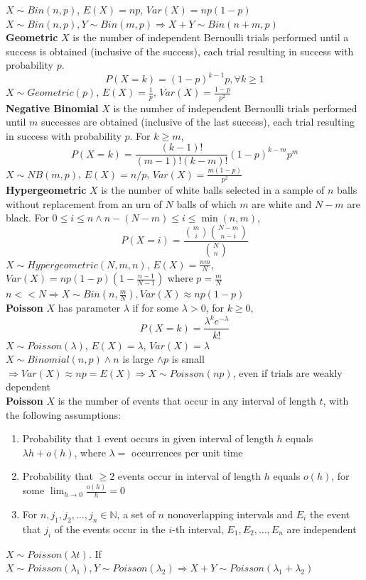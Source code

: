 $X\sim Bin(n,p)$, $E(X)=np$, $Var(X)=np(1-p)$\\
$X\sim Bin(n,p),Y\sim Bin(m,p)\Rightarrow X+Y\sim Bin(n+m,p)$\\
\textbf{Geometric} $X$ is the number of independent Bernoulli
trials performed until a success is obtained (inclusive of the success), each
trial resulting in success with probability $p$.
\[P(X=k) = {(1-p)}^{k-1}p,\forall k\ge 1\] 
$X\sim Geometric(p)$, $E(X)=\frac{1}{p}$, $Var(X)=\frac{1-p}{p^2}$\\
\textbf{Negative Binomial} $X$ is the number of independent
Bernoulli trials performed until $m$ successes are obtained (inclusive of the
last success), each trial resulting in success with probability $p$. For $k\ge
m$,
\[P(X=k) = \frac{(k-1)!}{(m-1)!(k-m)!}{(1-p)}^{k-m}p^m\]
$X\sim NB(m,p)$, $E(X) = n/p$, $Var(X)=\frac{m(1-p)}{p^2}$\\
\textbf{Hypergeometric} $X$ is the number of white balls
selected in a sample of $n$ balls without replacement from an urn of $N$ balls
of which $m$ are white and $N-m$ are black. For $0\le i\le n \wedge n-(N-m)\le i\le \min(n,m)$,
\[P(X=i)=\frac{\binom{m}{i}\binom{N-m}{n-i}}{\binom{N}{n}}\]
$X\sim Hypergeometric(N,m,n)$, $E(X)=\frac{nm}{N}$,\\
$Var(X)=np(1-p)(1-\frac{n-1}{N-1})$ where $p=\frac{m}{N}$\\
$n << N\Rightarrow X\sim Bin(n,\frac{m}{N}), Var(X)\approx np(1-p)$\\
\textbf{Poisson} $X$ has parameter $\lambda$ if for some
$\lambda>0$, for $k\ge0$,
\[P(X=k)=\frac{\lambda^{k}e^{-\lambda}}{k!}\] 
$X\sim Poisson(\lambda)$, $E(X)=\lambda$, $Var(X)=\lambda$\\
$X\sim Binomial(n,p)\wedge n$ is large $ \wedge p$ is small $\Rightarrow Var(X)\approx np=E(X)\Rightarrow
X\sim Poisson(np)$, even if trials are weakly dependent\\
\textbf{Poisson} $X$ is the number of events that occur in
any interval of length $t$, with the following assumptions:
\begin{enumerate}
  \item Probability that $1$ event occurs in given interval of length $h$
    equals $\lambda h+o(h)$, where $\lambda=$ occurrences per
    unit time
  \item Probability that $\ge2$ events occur in interval of length $h$ equals
    $o(h)$, for some $\lim_{h\to 0}\frac{o(h)}{h}=0$
  \item For $n, j_1, j_2, \ldots, j_n\in \mathbb{N}$, a set of $n$
    nonoverlapping intervals and $E_i$ the event that $j_i$ of the events occur
    in the $i$-th interval, $E_1, E_2,\ldots,E_n$ are independent
\end{enumerate}
$X\sim Poisson(\lambda t)$. If $X\sim Poisson(\lambda_1), Y\sim Poisson(\lambda_2) \Rightarrow X+Y\sim Poisson(\lambda_1+\lambda_2)$
